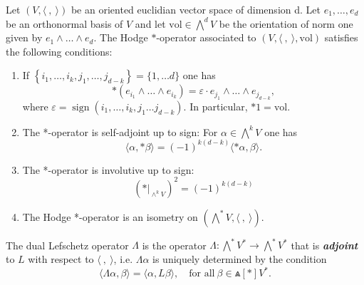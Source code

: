 \begin{proposition}
  Let $(V,\langle~,~\rangle)$ be an oriented euclidian vector space of dimension d. Let $e_1, \ldots, e_d$ be an orthonormal basis of $V$ and let $\mathrm{vol} \in \bigwedge^d V$ be the orientation of norm one given by $e_1 \wedge \ldots \wedge e_d$. The Hodge $*$-operator associated to $(V,\langle~,~\rangle, \mathrm{vol})$ satisfies the following conditions:
\begin{enumerate}[label=\roman*),font=\upshape]
  \item If $\left\{i_1, \ldots, i_k, j_1, \ldots, j_{d-k}\right\}=\{1, \ldots d\}$ one has
$$
*\left(e_{i_1} \wedge \ldots \wedge e_{i_k}\right)=\varepsilon \cdot e_{j_1} \wedge \ldots \wedge e_{j_{d-k}},
$$
where $\varepsilon=\operatorname{sign}\left(i_1, \ldots, i_k, j_1 \ldots j_{d-k}\right)$. In particular, $* 1= \mathrm{vol}$.
  \item The *-operator is self-adjoint up to sign: For $\alpha \in \bigwedge^k V$ one has
$$
\langle\alpha, * \beta\rangle=(-1)^{k(d-k)}\langle * \alpha, \beta\rangle .
$$
  \item The *-operator is involutive up to sign:
$$
\left(* \big|_{\wedge^k V}\right)^2=(-1)^{k(d-k)}
$$
  \item The Hodge *-operator is an isometry on $\left(\bigwedge^* V,\langle~,~\rangle\right)$.
\end{enumerate}
\end{proposition}
\begin{definition}
  The \textsf{dual Lefschetz operator} $\Lambda$ is the operator $\Lambda\colon \bigwedge^* V^*\to\bigwedge^* V^*$ that is \textbf{\textit{adjoint}} to $L$ with respect to $\langle~,~\rangle$, i.e. $\Lambda\alpha$ is uniquely determined by the condition 
  \[
    \langle \Lambda\alpha,\beta\rangle=\langle\alpha,L\beta\rangle, \quad \text{for all} ~\beta\in \Wedge[*]V^*.
  \]
\end{definition}

